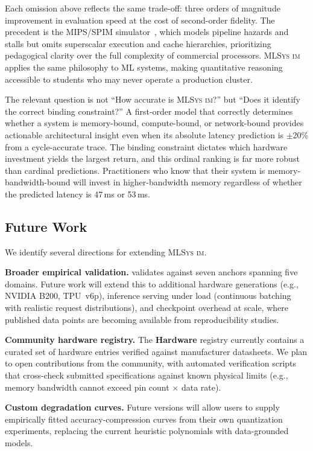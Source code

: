 \documentclass[10pt,twocolumn]{article}
\newcommand{\mlsysim}{\mbox{\textsc{MLSys}\,\textperiodcentered\,\textsc{im}}\xspace}
\begin{document}
Each omission above reflects the same trade-off: three orders of magnitude improvement in evaluation speed at the cost of second-order fidelity. The precedent is the MIPS/SPIM simulator~\citep{hennessy2024architecture}, which models pipeline hazards and stalls but omits superscalar execution and cache hierarchies, prioritizing pedagogical clarity over the full complexity of commercial processors. \mlsysim applies the same philosophy to ML systems, making quantitative reasoning accessible to students who may never operate a production cluster.

The relevant question is not ``How accurate is \mlsysim?'' but ``Does it identify the correct binding constraint?'' A first-order model that correctly determines whether a system is memory-bound, compute-bound, or network-bound provides actionable architectural insight even when its absolute latency prediction is $\pm$20\% from a cycle-accurate trace. The binding constraint dictates which hardware investment yields the largest return, and this ordinal ranking is far more robust than cardinal predictions. Practitioners who know that their system is memory-bandwidth-bound will invest in higher-bandwidth memory regardless of whether the predicted latency is 47\,ms or 53\,ms.

\subsection{Future Work}

We identify several directions for extending \mlsysim.

\textbf{Broader empirical validation.}  validates against seven anchors spanning five domains. Future work will extend this to additional hardware generations (e.g., NVIDIA B200, TPU~v6p), inference serving under load (continuous batching with realistic request distributions), and checkpoint overhead at scale, where published data points are becoming available from reproducibility studies.

\textbf{Community hardware registry.} The \textbf{Hardware} registry currently contains a curated set of hardware entries verified against manufacturer datasheets. We plan to open contributions from the community, with automated verification scripts that cross-check submitted specifications against known physical limits (e.g., memory bandwidth cannot exceed pin count $\times$ data rate).

\textbf{Custom degradation curves.} Future versions will allow users to supply empirically fitted accuracy-compression curves from their own quantization experiments, replacing the current heuristic polynomials with data-grounded models.
\end{document}
